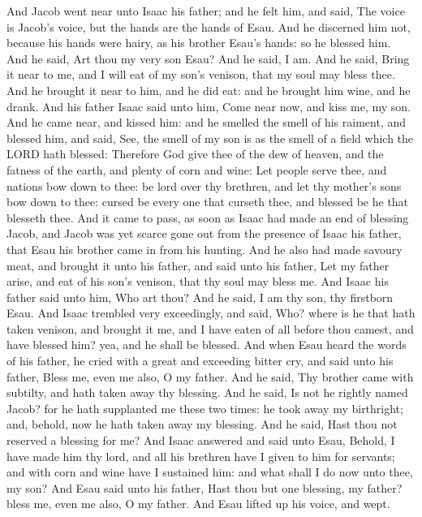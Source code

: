 \begin{biblechapter}
\verse And Jacob went near unto Isaac his father; and he felt him, and said, The voice is Jacob's voice, but the hands are the hands of Esau.
\verse And he discerned him not, because his hands were hairy, as his brother Esau's hands: so he blessed him.
\verse And he said, Art thou my very son Esau? And he said, I am.
\verse And he said, Bring it near to me, and I will eat of my son's venison, that my soul may bless thee. And he brought it near to him, and he did eat: and he brought him wine, and he drank.
\verse And his father Isaac said unto him, Come near now, and kiss me, my son.
\verse And he came near, and kissed him: and he smelled the smell of his raiment, and blessed him, and said, See, the smell of my son is as the smell of a field which the LORD hath blessed:
\verse Therefore God give thee of the dew of heaven, and the fatness of the earth, and plenty of corn and wine:
\verse Let people serve thee, and nations bow down to thee: be lord over thy brethren, and let thy mother's sons bow down to thee: cursed be every one that curseth thee, and blessed be he that blesseth thee.
\verse And it came to pass, as soon as Isaac had made an end of blessing Jacob, and Jacob was yet scarce gone out from the presence of Isaac his father, that Esau his brother came in from his hunting.
\verse And he also had made savoury meat, and brought it unto his father, and said unto his father, Let my father arise, and eat of his son's venison, that thy soul may bless me.
\verse And Isaac his father said unto him, Who art thou? And he said, I am thy son, thy firstborn Esau.
\verse And Isaac trembled very exceedingly, and said, Who? where is he that hath taken venison, and brought it me, and I have eaten of all before thou camest, and have blessed him? yea, and he shall be blessed.
\verse And when Esau heard the words of his father, he cried with a great and exceeding bitter cry, and said unto his father, Bless me, even me also, O my father.
\verse And he said, Thy brother came with subtilty, and hath taken away thy blessing.
\verse And he said, Is not he rightly named Jacob? for he hath supplanted me these two times: he took away my birthright; and, behold, now he hath taken away my blessing. And he said, Hast thou not reserved a blessing for me?
\verse And Isaac answered and said unto Esau, Behold, I have made him thy lord, and all his brethren have I given to him for servants; and with corn and wine have I sustained him: and what shall I do now unto thee, my son?
\verse And Esau said unto his father, Hast thou but one blessing, my father? bless me, even me also, O my father. And Esau lifted up his voice, and wept.

\end{biblechapter}
